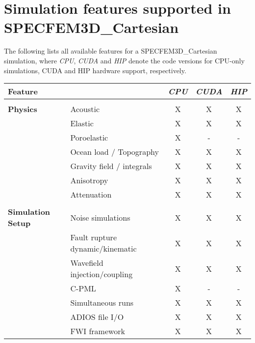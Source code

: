 \chapter*{Simulation features supported in SPECFEM3D\_Cartesian}

The following lists all available features for a SPECFEM3D\_Cartesian simulation,
where {\it CPU}, {\it CUDA} and {\it HIP} denote the code versions for CPU-only simulations,
CUDA and HIP hardware support, respectively.
%
\begin{table}[htp]
\vspace{-1cm}
\label{table:features}
\begin{center}
\begin{tabular}{ l l c c c}
\hline
{\bf Feature}   &   & {\it CPU} & {\it CUDA} & {\it HIP} \\
\hline
& & & & \\
{\bf Physics}   & Acoustic                        & X  & X  & X \\
                & Elastic                         & X  & X  & X \\
                & Poroelastic                     & X  & -  & - \\
                & Ocean load / Topography         & X  & X  & X \\
                & Gravity field / integrals       & X  & X  & X \\
                & Anisotropy                      & X  & X  & X \\
                & Attenuation                     & X  & X  & X \\
\hline
& & & & \\
{\bf Simulation Setup}  & Noise simulations                 & X  & X  & X \\
                        & Fault rupture dynamic/kinematic   & X  & X  & X \\
                        & Wavefield injection/coupling      & X  & X  & X \\
                        & C-PML                             & X  & -  & - \\
                        & Simultaneous runs                 & X  & X  & X \\
                        & ADIOS file I/O                    & X  & X  & X \\
                        & FWI framework                     & X  & X  & X \\


\end{tabular}
\end{center}
\end{table}
